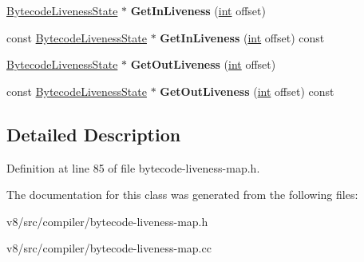 \begin{DoxyCompactItemize}
\mbox{\hyperlink{classv8_1_1internal_1_1compiler_1_1BytecodeLivenessState}{Bytecode\+Liveness\+State}} $\ast$ {\bfseries Get\+In\+Liveness} (\mbox{\hyperlink{classint}{int}} offset)
\item 
\mbox{\label{classv8_1_1internal_1_1compiler_1_1BytecodeLivenessMap_a417369732bea3a29c3092e43c1b0f8e7}} 
const \mbox{\hyperlink{classv8_1_1internal_1_1compiler_1_1BytecodeLivenessState}{Bytecode\+Liveness\+State}} $\ast$ {\bfseries Get\+In\+Liveness} (\mbox{\hyperlink{classint}{int}} offset) const
\item 
\mbox{\label{classv8_1_1internal_1_1compiler_1_1BytecodeLivenessMap_a3179bb8d1eddebe12df671cd61ef9559}} 
\mbox{\hyperlink{classv8_1_1internal_1_1compiler_1_1BytecodeLivenessState}{Bytecode\+Liveness\+State}} $\ast$ {\bfseries Get\+Out\+Liveness} (\mbox{\hyperlink{classint}{int}} offset)
\item 
\mbox{\label{classv8_1_1internal_1_1compiler_1_1BytecodeLivenessMap_aace4866364bf9bfb0475190132573026}} 
const \mbox{\hyperlink{classv8_1_1internal_1_1compiler_1_1BytecodeLivenessState}{Bytecode\+Liveness\+State}} $\ast$ {\bfseries Get\+Out\+Liveness} (\mbox{\hyperlink{classint}{int}} offset) const
\end{DoxyCompactItemize}


\subsection{Detailed Description}


Definition at line 85 of file bytecode-\/liveness-\/map.\+h.



The documentation for this class was generated from the following files\+:\begin{DoxyCompactItemize}
\item 
v8/src/compiler/bytecode-\/liveness-\/map.\+h\item 
v8/src/compiler/bytecode-\/liveness-\/map.\+cc\end{DoxyCompactItemize}
